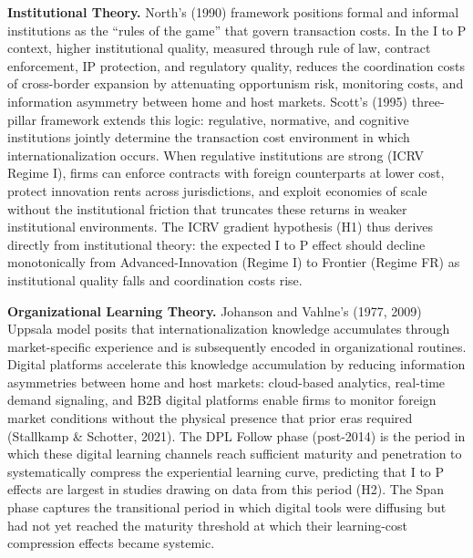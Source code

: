 \documentclass[
  12pt,a4paper]{article}
\begin{document}
\textbf{Institutional Theory.} North's (1990) framework positions formal
and informal institutions as the ``rules of the game'' that govern
transaction costs. In the I to P context, higher institutional quality,
measured through rule of law, contract enforcement, IP protection, and
regulatory quality, reduces the coordination costs of cross-border
expansion by attenuating opportunism risk, monitoring costs, and
information asymmetry between home and host markets. Scott's (1995)
three-pillar framework extends this logic: regulative, normative, and
cognitive institutions jointly determine the transaction cost
environment in which internationalization occurs. When regulative
institutions are strong (ICRV Regime I), firms can enforce contracts
with foreign counterparts at lower cost, protect innovation rents across
jurisdictions, and exploit economies of scale without the institutional
friction that truncates these returns in weaker institutional
environments. The ICRV gradient hypothesis (H1) thus derives directly
from institutional theory: the expected I to P effect should decline
monotonically from Advanced-Innovation (Regime I) to Frontier (Regime
FR) as institutional quality falls and coordination costs rise.

\textbf{Organizational Learning Theory.} Johanson and Vahlne's (1977,
2009) Uppsala model posits that internationalization knowledge
accumulates through market-specific experience and is subsequently
encoded in organizational routines. Digital platforms accelerate this
knowledge accumulation by reducing information asymmetries between home
and host markets: cloud-based analytics, real-time demand signaling, and
B2B digital platforms enable firms to monitor foreign market conditions
without the physical presence that prior eras required (Stallkamp \&
Schotter, 2021). The DPL Follow phase (post-2014) is the period in which
these digital learning channels reach sufficient maturity and
penetration to systematically compress the experiential learning curve,
predicting that I to P effects are largest in studies drawing on data
from this period (H2). The Span phase captures the transitional period
in which digital tools were diffusing but had not yet reached the
maturity threshold at which their learning-cost compression effects
became systemic.
\end{document}
